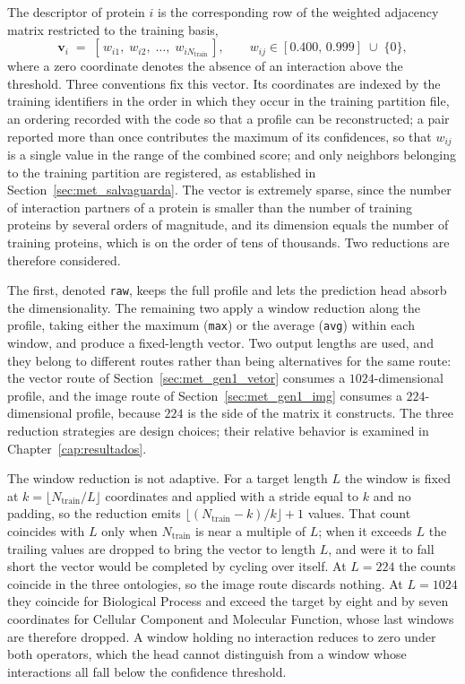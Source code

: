 \documentclass[Ingles]{ic-tese-v3}
\begin{document}
The descriptor of protein $i$ is the corresponding row of the weighted adjacency matrix restricted
to the training basis,
\begin{equation}
  \mathbf{v}_i \;=\; \left[\, w_{i1},\; w_{i2},\; \dots,\; w_{iN_{\text{train}}} \,\right],
  \qquad
  w_{ij} \in [0.400,\,0.999] \;\cup\; \{0\},
  \label{eq:met_perfil}
\end{equation}
\noindent where a zero coordinate denotes the absence of an interaction above the threshold. Three
conventions fix this vector. Its coordinates are indexed by the training identifiers in the order in
which they occur in the training partition file, an ordering recorded with the code so that a
profile
can be reconstructed; a pair reported more than once contributes the maximum of its confidences, so
that $w_{ij}$ is a single value in the range of the combined score; and only neighbors belonging to
the training partition are registered, as established in Section~\ref{sec:met_salvaguarda}. The
vector is extremely sparse, since the number of interaction partners of a protein is smaller than
the
number of training proteins by several orders of magnitude, and its dimension equals the number of
training proteins, which is on the order of tens of thousands. Two reductions are therefore
considered.

The first, denoted \texttt{raw}, keeps the full profile and lets the prediction head absorb the
dimensionality. The remaining two apply a window reduction along the profile, taking either the
maximum (\texttt{max}) or the average (\texttt{avg}) within each window, and produce a fixed-length vector. Two output lengths
are used, and they belong to different routes rather than being alternatives for the same route:
the vector route of Section~\ref{sec:met_gen1_vetor} consumes a $1024$-dimensional profile, and the
image route of Section~\ref{sec:met_gen1_img} consumes a $224$-dimensional profile, because $224$
is the side of the matrix it constructs. The three reduction strategies are design choices; their
relative behavior is examined in Chapter~\ref{cap:resultados}.

The window reduction is not adaptive. For a target length $L$ the window is fixed at
$k = \lfloor N_{\text{train}} / L \rfloor$ coordinates and applied with a stride equal to $k$ and no
padding, so the reduction emits $\lfloor (N_{\text{train}} - k)/k \rfloor + 1$ values. That count
coincides with $L$ only when $N_{\text{train}}$ is near a multiple of $L$; when it exceeds $L$ the
trailing values are dropped to bring the vector to length $L$, and were it to fall short the vector
would be completed by cycling over itself. At $L = 224$ the counts coincide in the three ontologies,
so the image route discards nothing. At $L = 1024$ they coincide for Biological Process and exceed
the target by eight and by seven coordinates for Cellular Component and Molecular Function, whose
last windows are therefore dropped. A window holding no interaction reduces to zero under both
operators, which the head cannot distinguish from a window whose interactions all fall below the
confidence threshold.
\end{document}
